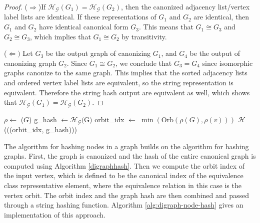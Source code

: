\documentclass[twoside,leqno]{article}
\begin{document}
\begin{proof}
($\Rightarrow$)If $\mathcal{H_G}(G_1)=\mathcal{H_G}(G_2)$, then the canonized adjacency list/vertex label lists are identical. If these representations of $G_1$ and $G_2$ are identical, then $G_1$ and $G_2$ have identical canonical form $G_3$. This means that $G_1 \cong G_3$ and $G_2 \cong G_3$, which implies that $G_1 \cong G_2$ by transitivity.


($\Leftarrow)$ Let $G_3$ be the output graph of canonizing $G_1$, and $G_4$ be the output of canonizing graph $G_2$. Since $G_1 \cong G_2$, we conclude that $G_3=G_4$ since isomorphic graphs canonize to the same graph. This implies that the sorted adjacency lists and ordered vertex label lists are equivalent, so the string representation is equivalent. Therefore the string hash output are equivalent as well, which shows that $\mathcal{H_G}(G_1)=\mathcal{H_G}(G_2)$. 
\end{proof}


\begin{algorithm}[t]
    \caption{Global Digraph Node Hash}\label{alg:digraph-node-hash}
    \begin{algorithmic}[1]
        \State $\rho \gets$ ($G$)
        \State g\_hash $\gets \mathcal{H_G}($G$)$
        \State orbit\_idx $\gets$ $\min(\text{Orb}(\rho(G), \rho(v)))$
        \State \Return $\mathcal{H}$(((orbit\_idx, g\_hash)))
    \EndFunction
    \end{algorithmic}
\end{algorithm}

The algorithm for hashing nodes in a graph builds on the algorithm for hashing graphs. First, the graph is canonized and the hash of the entire canonical graph is computed using Algorithm \ref{digraphhash}. Then we compute the orbit index of the input vertex, which is defined to be the canonical index of the equivalence class representative element, where the equivalence relation in this case is the vertex orbit. The orbit index and the graph hash are then combined and passed through a string hashing function. Algorithm \ref{alg:digraph-node-hash} gives an implementation of this approach.
\end{document}
